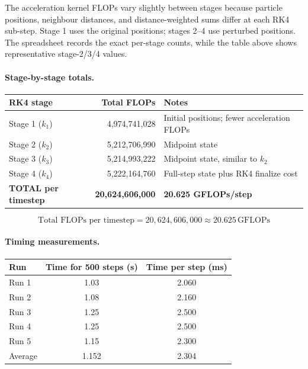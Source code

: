 \documentclass[11pt,a4paper]{article}
\begin{document}
The acceleration kernel FLOPs vary slightly between stages because particle
positions, neighbour distances, and distance-weighted sums differ at each RK4
sub-step. Stage 1 uses the original positions; stages 2--4 use perturbed
positions. The spreadsheet records the exact per-stage counts, while the table
above shows representative stage-2/3/4 values.

\paragraph{Stage-by-stage totals.}
\begin{center}
\begin{tabularx}{\linewidth}{XrX}
  \toprule
  \textbf{RK4 stage} & \textbf{Total FLOPs} & \textbf{Notes} \\
  \midrule
  Stage 1 ($k_1$) & 4{,}974{,}741{,}028 & Initial positions; fewer acceleration FLOPs \\
  Stage 2 ($k_2$) & 5{,}212{,}706{,}990 & Midpoint state \\
  Stage 3 ($k_3$) & 5{,}214{,}993{,}222 & Midpoint state, similar to $k_2$ \\
  Stage 4 ($k_4$) & 5{,}222{,}164{,}760 & Full-step state plus RK4 finalize cost \\
  \midrule
  \textbf{TOTAL per timestep} & \textbf{20{,}624{,}606{,}000} & \textbf{20.625 GFLOPs/step} \\
  \bottomrule
\end{tabularx}
\end{center}

\[
  \text{Total FLOPs per timestep}
  = 20{,}624{,}606{,}000
  \approx 20.625\,\text{GFLOPs}
\]

\paragraph{Timing measurements.}
\begin{center}
\begin{tabular}{lcc}
  \toprule
  \textbf{Run} & \textbf{Time for 500 steps (s)} & \textbf{Time per step (ms)} \\
  \midrule
  Run 1 & 1.03 & 2.060 \\
  Run 2 & 1.08 & 2.160 \\
  Run 3 & 1.25 & 2.500 \\
  Run 4 & 1.25 & 2.500 \\
  Run 5 & 1.15 & 2.300 \\
  \midrule
  Average & 1.152 & 2.304 \\
  \bottomrule
\end{tabular}
\end{center}
\end{document}
